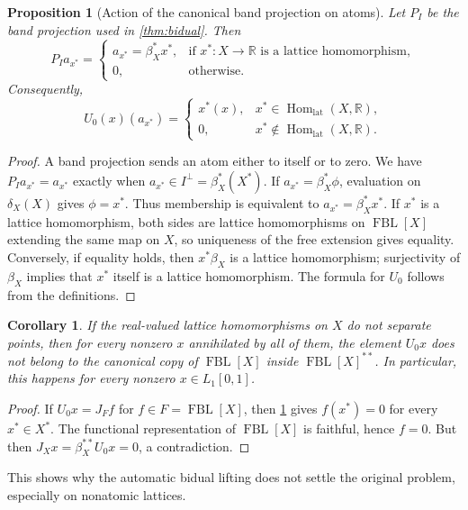 \documentclass[11pt]{article}
\newtheorem{proposition}[theorem]{Proposition}
\newtheorem{corollary}[theorem]{Corollary}
\newcommand{\FBL}{\operatorname{FBL}}
\newcommand{\Homlat}{\operatorname{Hom}_{\mathrm{lat}}}
\newcommand{\R}{\mathbb{R}}
\begin{document}
\begin{proposition}[Action of the canonical band projection on atoms]
\label{prop:atoms}
Let $P_I$ be the band projection used in \cref{thm:bidual}.  Then
\[
 P_Ia_{x^*}=
 \begin{cases}
 a_{x^*}=\beta_X^*x^*,&\text{if }x^*:X\to\R\text{ is a lattice homomorphism},\\
 0,&\text{otherwise}.
 \end{cases}
\]
Consequently,
\[
 U_0(x)(a_{x^*})=
 \begin{cases}
 x^*(x),&x^*\in\Homlat(X,\R),\\
 0,&x^*\notin\Homlat(X,\R).
 \end{cases}
\]
\end{proposition}

\begin{proof}
A band projection sends an atom either to itself or to zero.  We have
$P_Ia_{x^*}=a_{x^*}$ exactly when $a_{x^*}\in I^\perp=\beta_X^*(X^*)$.
If $a_{x^*}=\beta_X^*\phi$, evaluation on $\delta_X(X)$ gives $\phi=x^*$.
Thus membership is equivalent to
$a_{x^*}=\beta_X^*x^*$.  If $x^*$ is a lattice homomorphism, both sides are
lattice homomorphisms on $\FBL[X]$ extending the same map on $X$, so uniqueness
of the free extension gives equality.  Conversely, if equality holds, then
$x^*\beta_X$ is a lattice homomorphism; surjectivity of $\beta_X$ implies that
$x^*$ itself is a lattice homomorphism.  The formula for $U_0$ follows from
the definitions.
\end{proof}

\begin{corollary}\label{cor:canonical-fails}
If the real-valued lattice homomorphisms on $X$ do not separate points, then
for every nonzero $x$ annihilated by all of them, the element $U_0x$ does not
belong to the canonical copy of $\FBL[X]$ inside $\FBL[X]^{**}$.  In
particular, this happens for every nonzero $x\in L_1[0,1]$.
\end{corollary}

\begin{proof}
If $U_0x=J_Ff$ for $f\in F=\FBL[X]$, then \cref{prop:atoms} gives
$f(x^*)=0$ for every $x^*\in X^*$.  The functional representation of
$\FBL[X]$ is faithful, hence $f=0$.  But then
$J_Xx=\beta_X^{**}U_0x=0$, a contradiction.
\end{proof}

This shows why the automatic bidual lifting does not settle the original
problem, especially on nonatomic lattices.
\end{document}
